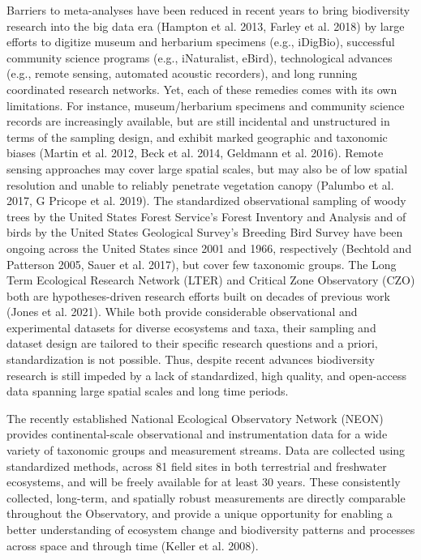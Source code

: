 \documentclass[
  12pt,
]{article}
\begin{document}
Barriers to meta-analyses have been reduced in recent years to bring biodiversity research into the big data era (Hampton et al. 2013, Farley et al. 2018) by large efforts to digitize museum and herbarium specimens (e.g., iDigBio), successful community science programs (e.g., iNaturalist, eBird), technological advances (e.g., remote sensing, automated acoustic recorders), and long running coordinated research networks. Yet, each of these remedies comes with its own limitations. For instance, museum/herbarium specimens and community science records are increasingly available, but are still incidental and unstructured in terms of the sampling design, and exhibit marked geographic and taxonomic biases (Martin et al. 2012, Beck et al. 2014, Geldmann et al. 2016). Remote sensing approaches may cover large spatial scales, but may also be of low spatial resolution and unable to reliably penetrate vegetation canopy (Palumbo et al. 2017, G Pricope et al. 2019). The standardized observational sampling of woody trees by the United States Forest Service's Forest Inventory and Analysis and of birds by the United States Geological Survey's Breeding Bird Survey have been ongoing across the United States since 2001 and 1966, respectively (Bechtold and Patterson 2005, Sauer et al. 2017), but cover few taxonomic groups. The Long Term Ecological Research Network (LTER) and Critical Zone Observatory (CZO) both are hypotheses-driven research efforts built on decades of previous work (Jones et al. 2021). While both provide considerable observational and experimental datasets for diverse ecosystems and taxa, their sampling and dataset design are tailored to their specific research questions and a priori, standardization is not possible. Thus, despite recent advances biodiversity research is still impeded by a lack of standardized, high quality, and open-access data spanning large spatial scales and long time periods.

The recently established National Ecological Observatory Network (NEON) provides continental-scale observational and instrumentation data for a wide variety of taxonomic groups and measurement streams. Data are collected using standardized methods, across 81 field sites in both terrestrial and freshwater ecosystems, and will be freely available for at least 30 years. These consistently collected, long-term, and spatially robust measurements are directly comparable throughout the Observatory, and provide a unique opportunity for enabling a better understanding of ecosystem change and biodiversity patterns and processes across space and through time (Keller et al. 2008).
\end{document}
